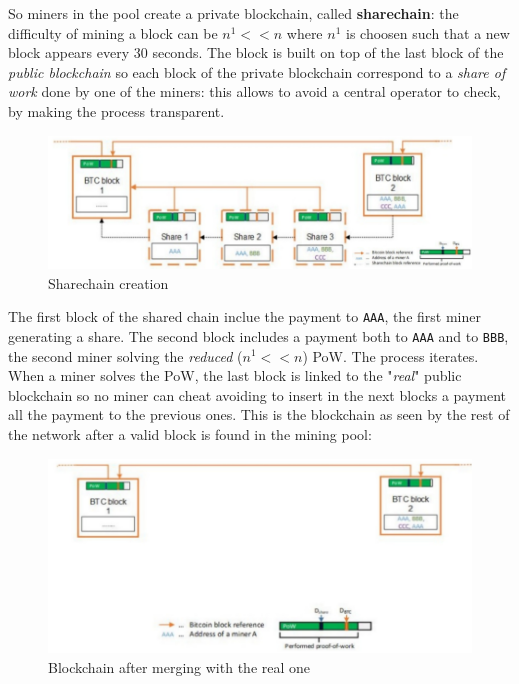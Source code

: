 \documentclass[10pt,a4paper]{report}
\begin{document}
So miners in the pool create a private blockchain, called \textbf{sharechain}: the difficulty of mining a block can be $n^{1} << n$ where $n^{1}$ is choosen such that a new block appears every 30 seconds. The block is built on top of the last block of the \textit{public blockchain} so each block of the private blockchain correspond to a \textit{share of work} done by one of the miners: this allows to avoid a central operator to check, by making the process transparent.
\begin{figure}[h]
	\centering
	\includegraphics[scale=0.50]{images/Pasted image 20230417110834.png}
	\caption{Sharechain creation}
\end{figure}

The first block of the shared chain inclue the payment to \texttt{AAA}, the first miner generating a share. The second block includes a payment both to \texttt{AAA} and to \texttt{BBB}, the second miner solving the \textit{reduced} ($n^{1} << n$) PoW. The process iterates.
When a miner solves the PoW, the last block is linked to the "\textit{real}" public blockchain so no miner can cheat avoiding to insert in the next blocks a payment all the payment to the previous ones.
This is the blockchain as seen by the rest of the network after a valid block is found in the mining pool:
\begin{figure}[h]
	\centering
	\includegraphics[scale=0.50]{images/Pasted image 20230417111102.png}
	\caption{Blockchain after merging with the real one}
\end{figure}
\end{document}
